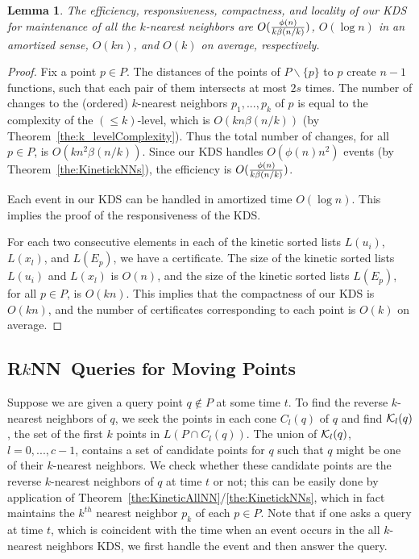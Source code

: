 \documentclass[preprint,12pt]{elsarticle}
\def\rknn{\mbox{R$k$NN}}
\newtheorem{lemma}{Lemma}[section]
\begin{document}
\begin{lemma}\label{the:kNNsPerfCri}
The efficiency, responsiveness, compactness, and locality of our KDS for maintenance of all the $k$-nearest neighbors are $O({\phi(n)\over k\beta(n/k)})$, $O(\log n)$ in an amortized sense, $O(kn)$, and $O(k)$ on average, respectively.
\end{lemma}
\begin{proof}
Fix a point $p\in P$. The distances of the points of $P\backslash \{p\}$ to $p$ create $n-1$ functions, such that each pair of them intersects at most $2s$ times. The number of changes to the (ordered) $k$-nearest neighbors $p_1,...,p_k$ of $p$ is equal to the complexity of the $(\leq k)$-level, which is $O(kn\beta(n/k))$  (by Theorem~\ref{the:k_levelComplexity}). Thus the total number of changes, for all $p\in P$, is $O(kn^2\beta(n/k))$. Since our KDS  handles $O(\phi(n) n^2)$ events (by Theorem~\ref{the:KinetickNNs}), the efficiency is $O({\phi(n)\over k\beta(n/k)})$.

Each event in our KDS can be handled in amortized time $O(\log n)$. This implies the proof of the responsiveness of the KDS.



For each two consecutive elements in each of the kinetic sorted lists $L(u_i)$, $L(x_l)$, and $L(E_p)$, we have a certificate. The size of the kinetic sorted lists $L(u_i)$ and $L(x_l)$ is $O(n)$, and the size of the kinetic sorted lists $L(E_p)$, for all $p\in P$, is $O(kn)$. This implies that the compactness of our KDS is $O(kn)$, and the number of certificates corresponding to each point is $O(k)$ on average.
\end{proof}
\subsection{\rknn~Queries for Moving Points}
Suppose we are given a query point $q\notin P$ at some time $t$. To find the reverse $k$-nearest neighbors of $q$, we seek the points in each cone $C_l(q)$ of $q$ and find ${\cal K}_l(q)$, the set of the first $k$ points in $L(P\cap C_l(q))$. The union of ${\cal K}_l(q)$, $l=0,...,c-1$, contains a set of candidate points for $q$ such that $q$ might be one of their $k$-nearest neighbors. We check whether these candidate points are the reverse $k$-nearest neighbors of $q$ at time $t$ or not; this can be easily done by application of Theorem~\ref{the:KineticAllNN}/\ref{the:KinetickNNs}, which in fact maintains the $k^{th}$ nearest neighbor $p_k$ of each $p\in P$. Note that if one asks a query at time $t$, which is coincident with the time when an event occurs in the all $k$-nearest neighbors KDS, we first handle the event and then answer the query. 
\end{document}
